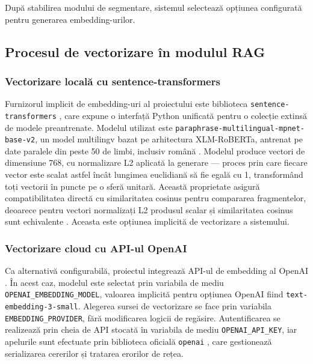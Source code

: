 \documentclass[12pt, a4paper, oneside, romanian]{teza-upb}
\begin{document}
După stabilirea modului de segmentare, sistemul selectează opțiunea configurată pentru generarea embedding-urilor.

\subsection{Procesul de vectorizare în modulul RAG}

\subsubsection{Vectorizare locală cu sentence-transformers}

Furnizorul implicit de 
embedding-uri al proiectului este biblioteca \texttt{sentence-transformers} 
\cite{sentence_transformers_doc}, care expune o interfață Python unificată pentru 
o colecție extinsă de modele preantrenate. Modelul utilizat este 
\texttt{paraphrase-multilingual-mpnet-base-v2}, un model multilingv bazat pe 
arhitectura XLM-RoBERTa, antrenat pe date paralele din peste 50 de limbi, 
inclusiv română \cite{paraphrase_multilingual_mpnet}. Modelul produce vectori de dimensiune 768, cu normalizare L2 aplicată la 
generare — proces prin care fiecare vector este scalat astfel încât lungimea 
euclidiană să fie egală cu 1, transformând toți vectorii în puncte pe o 
sferă unitară. Această proprietate asigură compatibilitatea directă cu 
similaritatea cosinus pentru compararea fragmentelor, deoarece pentru vectori 
normalizați L2 produsul scalar și similaritatea cosinus sunt echivalente 
\cite{paraphrase_multilingual_mpnet}. Aceasta este opțiunea implicită de vectorizare a sistemului.

\subsubsection{Vectorizare cloud cu API-ul OpenAI}

Ca alternativă configurabilă, proiectul integrează API-ul de embedding al OpenAI \cite{openai_embeddings}. În acest caz, modelul este selectat prin variabila de mediu \texttt{OPENAI\_EMBEDDING\_MODEL}, valoarea implicită pentru opțiunea OpenAI fiind \texttt{text-embedding-3-small}. Alegerea sursei de vectorizare se face prin variabila \texttt{EMBEDDING\_PROVIDER}, fără modificarea logicii de regăsire. Autentificarea se realizează prin cheia de API stocată în variabila de mediu \texttt{OPENAI\_API\_KEY}, iar apelurile sunt efectuate prin biblioteca oficială \texttt{openai} \cite{openai_api}, care gestionează serializarea cererilor și tratarea erorilor de rețea.
\end{document}
